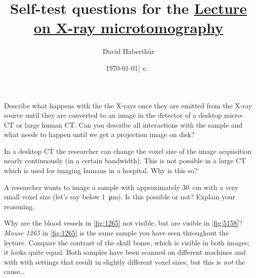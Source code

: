 \documentclass[a4paper]{exam}
\title{Self-test questions for the \href{https://ilias.unibe.ch/goto_ilias3_unibe_sess_2466944.html}{Lecture on X-ray microtomography}}
\author{David Haberthür}
\date{\today\xspace| v.~\gitAbbrevHash}
\newcommand{\uct}{{\textmu}CT\xspace}%
\newcommand{\mct}{micro-CT\xspace}%
\begin{document}
\maketitle

\begin{questions}

\question Describe what happens with the the X-rays once they are emitted from the X-ray source until they are converted to an image in the detector of a desktop \mct or large human CT\@.
	Can you describe all interactions with the sample and what needs to happen until we get a projection image on disk?

\question In a desktop \uct the researcher can change the voxel size of the image acquisition nearly continuously (in a certain bandwidth).
	This is not possible in a large CT which is used for imaging humans in a hospital.
	Why is this so?

\question A researcher wants to image a sample with approximately \SI{30}{\centi\meter} with a very small voxel size (let's say below \SI{1}{\micro\meter}).
	Is this possible or not?
	Explain your reasoning.

\question Why are the blood vessels in \autoref{fig:1265} not visible, but are visible in \autoref{fig:5158}?
	\emph{Mouse 1265} in \autoref{fig:1265} is the same sample you have seen throughout the lecture.
	Compare the contrast of the skull bones, which is visible in both images; it looks quite equal.
	Both samples have been scanned on different machines and with with settings that result in slightly different voxel sizes, but this is \emph{not} the cause\ldots


\end{questions}
\end{document}
